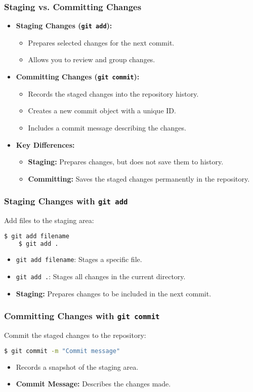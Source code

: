 \begin{frame}
	\frametitle{Staging vs. Committing Changes}
	\begin{itemize}
		\item \textbf{Staging Changes (\texttt{git add}):}
		\begin{itemize}
			\item Prepares selected changes for the next commit.
			\item Allows you to review and group changes.
		\end{itemize}
		\item \textbf{Committing Changes (\texttt{git commit}):}
		\begin{itemize}
			\item Records the staged changes into the repository history.
			\item Creates a new commit object with a unique ID.
			\item Includes a commit message describing the changes.
		\end{itemize}
		\item \textbf{Key Differences:}
		\begin{itemize}
			\item \textbf{Staging:} Prepares changes, but does not save them to history.
			\item \textbf{Committing:} Saves the staged changes permanently in the repository.
		\end{itemize}
	\end{itemize}
\end{frame}

\begin{frame}[fragile]
	\frametitle{Staging Changes with \texttt{git add}}
	Add files to the staging area:
	\begin{lstlisting}[language=bash]
	$ git add filename
	$ git add .
	\end{lstlisting}
	\begin{itemize}
		\item \texttt{git add filename}: Stages a specific file.
		\item \texttt{git add .}: Stages all changes in the current directory.
		\item \textbf{Staging:} Prepares changes to be included in the next commit.
	\end{itemize}
\end{frame}

\begin{frame}[fragile]
	\frametitle{Committing Changes with \texttt{git commit}}
	Commit the staged changes to the repository:
	\begin{lstlisting}[language=bash]
	$ git commit -m "Commit message"
	\end{lstlisting}
	\begin{itemize}
		\item Records a snapshot of the staging area.
		\item \textbf{Commit Message:} Describes the changes made.
	\end{itemize}
\end{frame}

